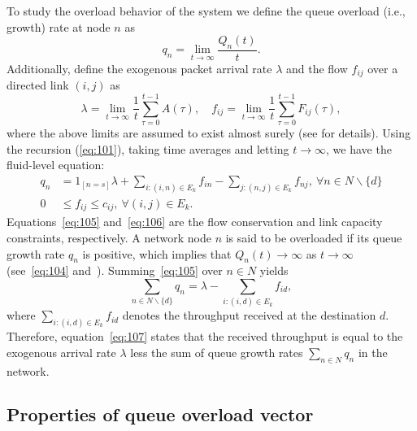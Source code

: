 \documentclass{sig-alternate-2013}
\begin{document}
To study the overload behavior of the system we define
the queue overload (i.e., growth) rate at node $n$ as
\begin{equation} \label{eq:104}
q_n = \lim_{t\rightarrow \infty} \frac{Q_n(t)}{t}.
\end{equation}
Additionally, define the exogenous packet arrival rate $\lambda$ and  the flow $f_{ij}$ over a directed link $(i, j)$  as
\begin{equation*} \label{eq:102}
\lambda = \lim_{t\rightarrow \infty} \frac{1}{t}\sum_{\tau=0}^{t-1} A(\tau),\quad f_{ij} = \lim_{t\rightarrow \infty} \frac{1}{t}\sum_{\tau=0}^{t-1} F_{ij}(\tau),
\end{equation*}
where the above limits are assumed to exist almost surely (see \cite{georgiadis} for details). Using the recursion (\ref{eq:101}), taking time averages and letting $t\to\infty$, we have the fluid-level equation:
\begin{align} 
q_n &=  1_{[n=s]} \lambda+ \sum_{i: (i,n) \in E_k}  f_{in} - \sum_{j: (n,j) \in E_k}  f_{nj},\ \forall n \in N\backslash \{d\} \label{eq:105} \\ 
0 &\le f_{ij} \le c_{ij},\ \forall (i, j) \in E_k. \label{eq:106}
\end{align}
Equations~\eqref{eq:105} and~\eqref{eq:106} are the flow conservation and link capacity constraints, respectively. A network node $n$ is said to be overloaded if its queue growth rate $q_{n}$ is positive, which implies that $Q_n(t) \rightarrow \infty$ as $t \rightarrow \infty$ (see~\eqref{eq:104} and~\cite{Nee10book}). Summing~\eqref{eq:105} over $n\in N$ yields
\begin{equation} \label{eq:107}
\sum_{n\in N\backslash \{d\}} q_{n} = \lambda - \sum_{i: (i, d)\in E_{k}} f_{id},
\end{equation}
where $\sum_{i: (i, d)\in E_{k}} f_{id}$ denotes the throughput received at the destination  $d$.
Therefore, equation~\eqref{eq:107} states that the received throughput 
is equal to the exogenous arrival rate $\lambda$ less the sum of queue growth rates $\sum_{n\in N} q_{n}$ in the network.

\subsection{Properties of queue overload vector}
\end{document}
